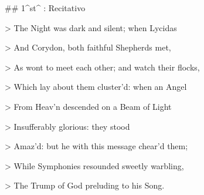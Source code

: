 ## 1^st^ \mvmt: Recitativo

\beginnumbering
\pstart
> The Night was dark and silent; when Lycidas 

> And Corydon, both faithful Shepherds met, 

> As wont to meet each other; and watch their flocks, 

> Which lay about them cluster’d: when an Angel 

> From Heav’n descended on a Beam of Light 

> Insufferably glorious: they stood 

> Amaz’d: but he with this message chear’d them; 

> While Symphonies resounded sweetly warbling, 

> The Trump of God preluding to his Song.
\pend
\endnumbering
